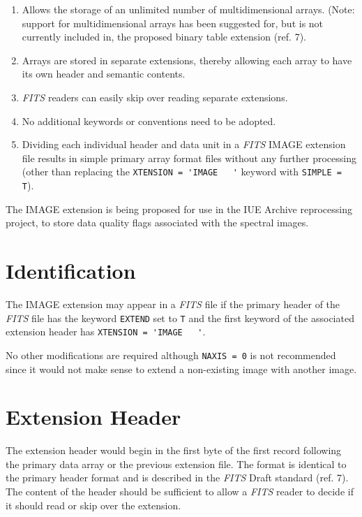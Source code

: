 \begin{enumerate}
 \item Allows the storage of an unlimited number of multidimensional arrays.
 (Note: support for multidimensional arrays has been suggested for, but is not
 currently included in, the proposed binary table extension (ref. 7).
 \item Arrays are stored in separate extensions, thereby allowing
 each array to have its own header and semantic contents.
 \item {\sl FITS} readers can easily skip over reading separate extensions.
 \item No additional keywords or conventions need to be adopted.
 \item Dividing each individual header and data unit in a {\sl FITS} IMAGE
 extension file results in simple primary array format files without
 any further processing (other than replacing the 
 {\tt XTENSION = }\verb*+'IMAGE   '+ keyword with {\tt SIMPLE = T}).
\end{enumerate}

 The IMAGE extension is being proposed for use in the IUE Archive
reprocessing project, to store data quality flags associated with 
the spectral images.

\newpage

\section{Identification}
The IMAGE extension may appear in a {\sl FITS} file if the primary header of 
the {\sl FITS} file has the keyword {\tt EXTEND} set to {\tt T} and the first
keyword of the associated extension header has 
{\tt XTENSION = }\verb*+'IMAGE   '+.

No other modifications are required although {\tt NAXIS = 0}
is not recommended since it would not make sense to extend a non-existing 
image with another image.

\section{Extension Header}

The extension header would begin in the first byte of the first record
following the primary data array or the previous extension file. The
format is identical to the primary header format and is described in the
{\sl FITS} Draft standard (ref. 7). 
The content of the header should be sufficient to
allow a {\sl FITS} reader to decide if it should read or skip over the
extension. 

